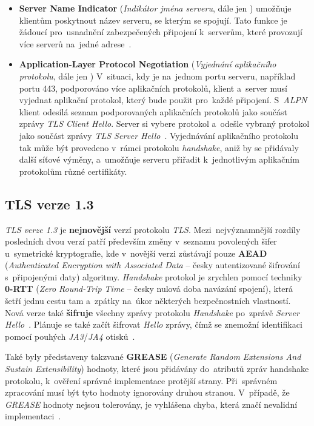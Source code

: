 \begin{itemize}
	\item \textbf{Server Name Indicator} (\textit{Indikátor jména serveru}, dále jen ) umožňuje klientům poskytnout název serveru, se kterým se spojují. Tato funkce je žádoucí pro~usnadnění zabezpečených připojení k~serverům, které provozují více  serverů na~jedné adrese~\cite{rfc-sni}.
	      	          
	\item \textbf{Application-Layer Protocol Negotiation} (\textit{Vyjednání aplikačního protokolu}, dále jen ) V~situaci, kdy je na~jednom portu serveru, například portu 443, podporováno více aplikačních protokolů, klient a~server musí vyjednat aplikační protokol, který bude použit pro~každé připojení. S~\textit{ALPN} klient odesílá seznam podporovaných aplikačních protokolů jako součást zprávy \textit{TLS Client Hello}. Server si vybere protokol a~odešle vybraný protokol jako součást zprávy \textit{TLS Server Hello}~\cite{rfc-alpn}. Vyjednávání aplikačního protokolu tak může být provedeno v~rámci protokolu \textit{handshake}, aniž by se přidávaly další síťové výměny, a~umožňuje serveru přiřadit k~jednotlivým aplikačním protokolům různé certifikáty.
	      	      
\end{itemize}

\subsection{TLS verze 1.3}
\label{sec:tls-13}
\textit{TLS verze 1.3} je \textbf{nejnovější} verzí protokolu \textit{TLS}. Mezi~nejvýznamnější rozdíly posledních dvou verzí patří především změny v~seznamu povolených šifer u~symetrické kryptografie, kde v~novější verzi zůstávají pouze \textbf{AEAD} (\textit{Authenticated Encryption with Associated Data} -- česky autentizované šifrování s~připojenými daty) algoritmy. \textit{Handshake} protokol je zrychlen pomocí techniky \textbf{0-RTT} (\textit{Zero Round-Trip Time} -- česky nulová doba navázání spojení), která šetří jednu cestu tam a~zpátky na~úkor některých bezpečnostních vlastností. Nová verze také \textbf{šifruje} všechny zprávy protokolu \textit{Handshake} po~zprávě \textit{Server Hello}~\cite{rfc-tls13}. Plánuje se také začít šifrovat \textit{Hello} zprávy, čímž se znemožní identifikaci pomocí pouhých \textit{JA3}/\textit{JA4} otisků~\cite{encrypted-hello}.

Také byly představeny takzvané \textbf{GREASE} (\textit{Generate Random Extensions And Sustain Extensibility}) hodnoty, které jsou přidávány do~atributů zpráv handshake protokolu, k~ověření správné implementace protější strany. Při~správném zpracování musí být tyto hodnoty ignorovány druhou stranou. V~případě, že \textit{GREASE} hodnoty nejsou tolerovány, je vyhlášena chyba, která značí nevalidní implementaci~\cite{rfc-grease}.

